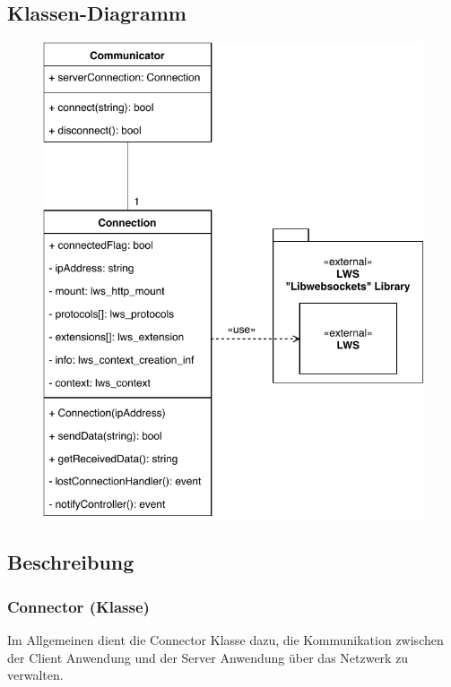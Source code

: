 \subsection{Klassen-Diagramm}

    \begin{figure}[H]
        \centering
        \includegraphics[scale=1]{images/Kommunikator.pdf}
    \end{figure}
    
    \newpage

\subsection{Beschreibung}
	\subsubsection{Connector (Klasse)}
	
		Im Allgemeinen dient die Connector Klasse dazu, die Kommunikation zwischen der Client Anwendung und der Server Anwendung über das Netzwerk zu verwalten. 
	
